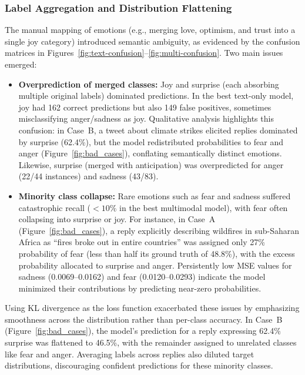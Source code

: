 \subsubsection*{Label Aggregation and Distribution Flattening}
The manual mapping of emotions (e.g., merging love, optimism, and trust into a single joy category) introduced semantic ambiguity, as evidenced by the confusion matrices in Figures~\ref{fig:text-confusion}--\ref{fig:multi-confusion}. Two main issues emerged:
\begin{itemize}
    \item \textbf{Overprediction of merged classes:} Joy and surprise (each absorbing multiple original labels) dominated predictions. In the best text-only model, joy had 162 correct predictions but also 149 false positives, sometimes misclassifying anger/sadness as joy. Qualitative analysis highlights this confusion: in Case~B, a tweet about climate strikes elicited replies dominated by surprise (62.4\%), but the model redistributed probabilities to fear and anger (Figure~\ref{fig:bad_cases}), conflating semantically distinct emotions. Likewise, surprise (merged with anticipation) was overpredicted for anger (22/44 instances) and sadness (43/83).
    \item \textbf{Minority class collapse:} Rare emotions such as fear and sadness suffered catastrophic recall ($<10\%$ in the best multimodal model), with fear often collapsing into surprise or joy. For instance, in Case~A (Figure~\ref{fig:bad_cases}), a reply explicitly describing wildfires in sub-Saharan Africa as ``fires broke out in entire countries'' was assigned only 27\% probability of fear (less than half its ground truth of 48.8\%), with the excess probability allocated to surprise and anger. Persistently low MSE values for sadness (0.0069--0.0162) and fear (0.0120--0.0293) indicate the model minimized their contributions by predicting near-zero probabilities.
\end{itemize}

Using KL divergence as the loss function exacerbated these issues by emphasizing smoothness across the distribution rather than per-class accuracy. In Case~B (Figure~\ref{fig:bad_cases}), the model's prediction for a reply expressing 62.4\% surprise was flattened to 46.5\%, with the remainder assigned to unrelated classes like fear and anger. Averaging labels across replies also diluted target distributions, discouraging confident predictions for these minority classes.

